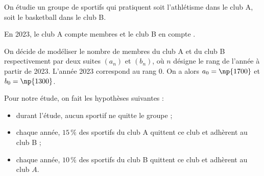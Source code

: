 
\medskip

On étudie un groupe de  sportifs qui pratiquent soit l'athlétisme dans le club A, soit le basketball dans le club B.

En 2023, le club A compte  membres et le club B en compte .


On décide de modéliser le nombre de membres du club A et du club B respectivement par deux suites $\left(a_{n}\right)$ et $\left(b_{n}\right)$, où $n$ désigne le rang de l'année à partir de 2023.
L'année 2023 correspond au rang 0. On a alors $a_{0}= \np{1700}$ et $b_{0} = \np{1300}$.

Pour notre étude, on fait les hypothèses suivantes :
\begin{itemize}
\item durant l'étude, aucun sportif ne quitte le groupe ;
\item chaque année, $15\,\%$ des sportifs du club A quittent ce club et adhèrent au club B ;
\item chaque année, $10\,\%$ des sportifs du club B quittent ce club et adhèrent au club $A$.
\end{itemize}


